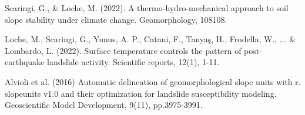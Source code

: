 {Scaringi, G., \& Loche, M. (2022). A thermo-hydro-mechanical approach to soil slope stability under climate change. Geomorphology, 108108.

Loche, M., Scaringi, G., Yunus, A. P., Catani, F., Tanyaş, H., Frodella, W., ... \& Lombardo, L. (2022). Surface temperature controls the pattern of post-earthquake landslide activity. Scientific reports, 12(1), 1-11.

Alvioli et al. (2016) Automatic delineation of geomorphological slope units with r. slopeunits v1.0 and their optimization for landslide susceptibility modeling. Geoscientific Model Development, 9(11), pp.3975-3991.

}


